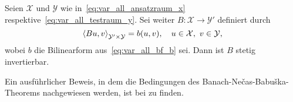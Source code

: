 \begin{Satz}
\label{thm:schwab09:theorem51}
    Seien $\mathcal X$ und $\mathcal Y$ wie in~\cref{eq:var_all_ansatzraum_x} respektive~\cref{eq:var_all_testraum_y}.
    Sei weiter $B \colon \mathcal X \to \mathcal Y'$ definiert durch
    \begin{equation}
        \label{eq:var_all_gross_b}
        \left\langle B u,v\right\rangle_{\mathcal Y' \times \mathcal Y} = b(u, v), \quad u \in \mathcal X,~v \in \mathcal Y,
    \end{equation}
    wobei $b$ die Bilinearform aus~\cref{eq:var_all_bf_b} sei.
    Dann ist $B$ stetig invertierbar.

    \begin{Beweis}
        Ein ausführlicher Beweis, in dem die Bedingungen des Banach-Ne\v{c}as-Babu\v{s}ka-Theorems nachgewiesen werden, ist bei \textcite[Appendix A]{Schwab:2009ec} zu finden.



\end{Beweis}
\end{Satz}
